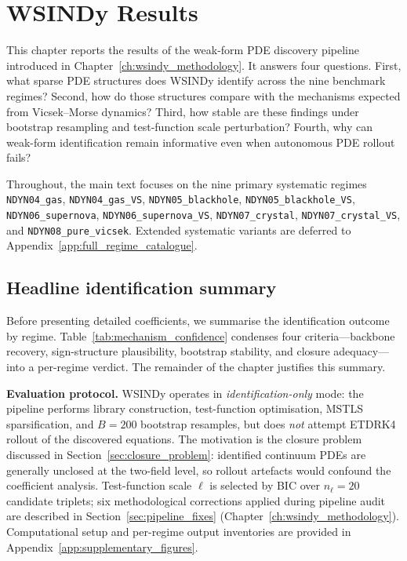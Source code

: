 \chapter{WSINDy Results}
\label{ch:wsindy_results}

This chapter reports the results of the weak-form PDE discovery pipeline
introduced in Chapter~\ref{ch:wsindy_methodology}.  It answers four
questions.  First, what sparse PDE structures does WSINDy identify across
the nine benchmark regimes?  Second, how do those structures compare with
the mechanisms expected from Vicsek--Morse dynamics?  Third, how stable are
these findings under bootstrap resampling and test-function scale
perturbation?  Fourth, why can weak-form identification remain informative
even when autonomous PDE rollout fails?

Throughout, the main text focuses on the nine primary systematic regimes
\texttt{NDYN04\_gas}, \texttt{NDYN04\_gas\_VS},
\texttt{NDYN05\_blackhole}, \texttt{NDYN05\_blackhole\_VS},
\texttt{NDYN06\_supernova}, \texttt{NDYN06\_supernova\_VS},
\texttt{NDYN07\_crystal}, \texttt{NDYN07\_crystal\_VS},
and \texttt{NDYN08\_pure\_vicsek}.  Extended systematic variants are
deferred to Appendix~\ref{app:full_regime_catalogue}.

\section{Headline identification summary}
\label{sec:wsindy_headline}

Before presenting detailed coefficients, we summarise the identification
outcome by regime.  Table~\ref{tab:mechanism_confidence} condenses four
criteria---backbone recovery, sign-structure plausibility, bootstrap
stability, and closure adequacy---into a per-regime verdict.  The remainder
of the chapter justifies this summary.

\label{sec:wsindy_experimental_design}
\noindent\textbf{Evaluation protocol.}
WSINDy operates in \emph{identification-only} mode: the pipeline performs
library construction, test-function optimisation, MSTLS sparsification, and
$B{=}200$ bootstrap resamples, but does \emph{not} attempt ETDRK4 rollout
of the discovered equations.  The motivation is the closure problem
discussed in Section~\ref{sec:closure_problem}: identified continuum PDEs
are generally unclosed at the two-field level, so rollout artefacts would
confound the coefficient analysis.  Test-function scale
$\boldsymbol{\ell}$ is selected by BIC over $n_\ell{=}20$ candidate
triplets; six methodological corrections applied during pipeline audit are
described in Section~\ref{sec:pipeline_fixes}
(Chapter~\ref{ch:wsindy_methodology}).  Computational setup and per-regime
output inventories are provided in
Appendix~\ref{app:supplementary_figures}.

